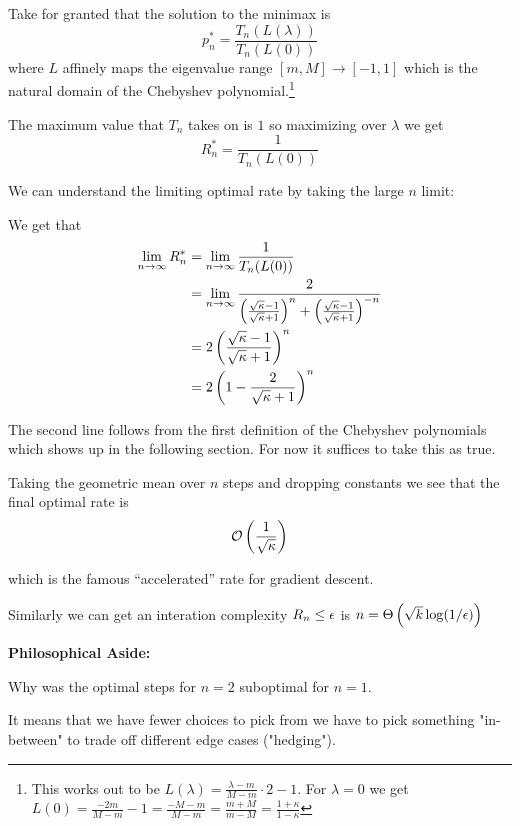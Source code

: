 \documentclass[11pt]{article}
\begin{document}
Take for granted that the solution to the minimax is 
\begin{equation}\label{eq:chebyshev-opt}
    p^*_n = \frac{T_n(L(\lambda))}{T_n(L(0))}
\end{equation}
where $L$ affinely maps the eigenvalue range $[m, M] \to [-1, 1]$ which is the natural domain of the Chebyshev polynomial.\footnote{This works out to be $L(\lambda) = \frac{\lambda - m}{M-m} \cdot 2 - 1$. For $\lambda=0$ we get $L(0) = \frac{-2m}{M-m}-1 = \frac{- M -m}{M-m} = \frac{m+M}{m-M} = \frac{1+\kappa}{1-\kappa}$}

The maximum value that $T_n$ takes on is $1$ so maximizing over $\lambda$ we get \[R^*_n = \frac{1}{T_n(L(0))}\]


We can understand the limiting optimal rate by taking the large $n$ limit:


We get that
\begin{align*}
    \lim_{n\rightarrow \infty} R^*_n &= \lim_{n\rightarrow \infty} \frac{1}{T_n(L(0))} \\
    &= \lim_{n\rightarrow \infty} \frac{2}{\left(\frac{\sqrt \kappa - 1}{\sqrt \kappa + 1}\right)^n + \left(\frac{\sqrt \kappa - 1}{\sqrt \kappa + 1}\right)^{-n} } \\
    &= 2 \left(\frac{\sqrt{\kappa}-1}{\sqrt{\kappa} + 1}\right)^n \\
    &= 2\left(1 - \frac{2}{\sqrt{\kappa}+1}\right)^n
\end{align*}

The second line follows from the first definition of the Chebyshev polynomials which shows up in the following section. For now it suffices to take this as true.

Taking the geometric mean over $n$ steps and dropping constants we see that the final optimal rate is  
\[\mathcal{O}\left(\frac{1}{\sqrt \kappa}\right)\]

which is the famous ``accelerated'' rate for gradient descent.


Similarly we can get an interation complexity $R_n \leq \epsilon$ is $n= \Theta\left(\sqrt{k} \log(1/\epsilon)\right)$ 




\textbf{Philosophical Aside:}

Why was the optimal steps for $n=2$ suboptimal for $n=1$. 

It means that we have fewer choices to pick from we have to pick something "in-between" to trade off different edge cases ("hedging").
\end{document}
